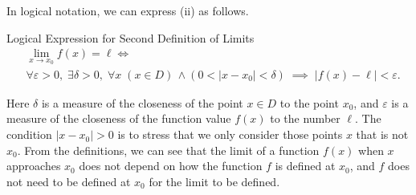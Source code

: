  In logical notation, we can express (ii) as follows.
  \begin{highlight}{Logical Expression for Second Definition of  Limits}
 ~\vspace{-0.5cm}
 \begin{align*}
 & \lim_{x\rightarrow x_0}f(x)=\ell 
 \iff \\& \forall  \varepsilon>0, \;\exists \delta>0,\;\forall x\; (x\in D)\,\wedge (0<|x-x_0|<\delta)\;\implies \;|f(x)-\ell|<\varepsilon.\end{align*}
 \end{highlight}
 Here $\delta$ is a measure of the closeness of the point $x\in D$ to the point $x_0$, and $\varepsilon$ is a measure of the closeness of the function value $f(x)$ to the number $\ell$. The condition $|x-x_0|>0$ is to stress that we only consider those points $x$ that is not $x_0$. From the definitions, we can see that the limit of a function $f(x)$ when $x$ approaches $x_0$ does not depend on how the function $f $ is defined at $x_0$, and  $f$   does  not need to be defined at $x_0$ for the limit to be defined. 
 
 
 
